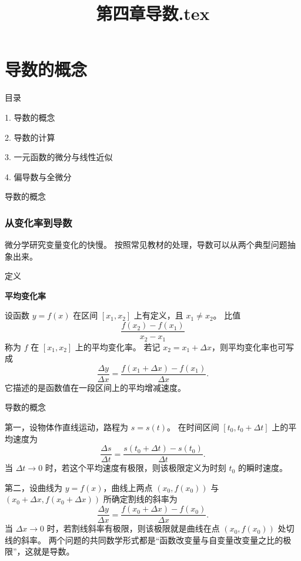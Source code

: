 \documentclass[aspectratio=169,10pt,fontset=fandol]{ctexbeamer}
\title{第四章导数.tex}
\begin{document}
\section{导数的概念}
\begin{frame}[t,fragile]{目录}
\normalsize
{\color{blue}\normalsize 1. 导数的概念\par}\vspace{0.22em}
{\color{gray!40}\normalsize 2. 导数的计算\par}\vspace{0.22em}
{\color{gray!40}\normalsize 3. 一元函数的微分与线性近似\par}\vspace{0.22em}
{\color{gray!40}\normalsize 4. 偏导数与全微分\par}\vspace{0.22em}
\end{frame}
\begin{frame}[t,fragile]{导数的概念}
\normalsize
{\normalsize

\subsubsection*{从变化率到导数}


}
{\normalsize
微分学研究变量变化的快慢。 按照常见教材的处理，导数可以从两个典型问题抽象出来。


}
\begin{block}{定义}
{\normalsize
\textbf{平均变化率}\par

设函数 $y=f(x)$ 在区间 $[x_1,x_2]$ 上有定义，且 $x_1\neq x_2$。 比值
\[
\frac{f(x_2)-f(x_1)}{x_2-x_1}
\]
称为 $f$ 在 $[x_1,x_2]$ 上的平均变化率。 若记 $x_2=x_1+\Delta x$，则平均变化率也可写成
\[
\frac{\Delta y}{\Delta x}
=\frac{f(x_1+\Delta x)-f(x_1)}{\Delta x}.
\]
它描述的是函数值在一段区间上的平均增减速度。

}
\end{block}
\end{frame}
\begin{frame}[t,fragile]{导数的概念}
\normalsize
{\normalsize
第一，设物体作直线运动，路程为 $s=s(t)$。 在时间区间 $[t_0,t_0+\Delta t]$ 上的平均速度为
\[
\frac{\Delta s}{\Delta t}
=\frac{s(t_0+\Delta t)-s(t_0)}{\Delta t}.
\]
当 $\Delta t\to0$ 时，若这个平均速度有极限，则该极限定义为时刻 $t_0$ 的瞬时速度。


}
{\normalsize
第二，设曲线为 $y=f(x)$，曲线上两点 $(x_0,f(x_0))$ 与 $(x_0+\Delta x,f(x_0+\Delta x))$ 所确定割线的斜率为
\[
\frac{\Delta y}{\Delta x}
=\frac{f(x_0+\Delta x)-f(x_0)}{\Delta x}.
\]
当 $\Delta x\to0$ 时，若割线斜率有极限，则该极限就是曲线在点 $(x_0,f(x_0))$ 处切线的斜率。 两个问题的共同数学形式都是“函数改变量与自变量改变量之比的极限”，这就是导数。


}
\end{frame}
\end{document}
